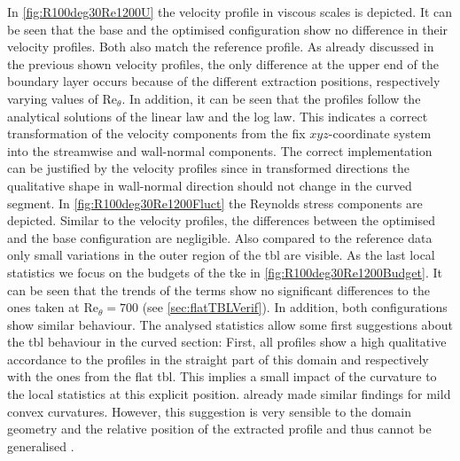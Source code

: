 In \autoref{fig:R100deg30Re1200U} the velocity profile in viscous scales is depicted.
It can be seen that the base and the optimised configuration show no difference in their velocity profiles.
Both also match the reference profile.
As already discussed in the previous shown velocity profiles, the only difference at the upper end of the boundary layer occurs because of the different extraction positions, respectively varying values of $\mathrm{Re}_{\theta}$. 
In addition, it can be seen that the profiles follow the analytical solutions of the linear law and the log law.
This indicates a correct transformation of the velocity components from the fix $xyz$-coordinate system into the streamwise and wall-normal components. 
The correct implementation can be justified by the velocity profiles since in transformed directions the qualitative shape in wall-normal direction should not change in the curved segment.
In \autoref{fig:R100deg30Re1200Fluct} the Reynolds stress components are depicted.
Similar to the velocity profiles, the differences between the optimised and the base configuration are negligible.
Also compared to the reference data only small variations in the outer region of the \acrshort{tbl} are visible.
As the last local statistics we focus on the budgets of the \acrshort{tke} in \autoref{fig:R100deg30Re1200Budget}.
It can be seen that the trends of the terms show no significant differences to the ones taken at $\mathrm{Re}_{\theta} = 700$ (see \autoref{sec:flatTBLVerif}).
In addition, both configurations show similar behaviour.
The analysed statistics allow some first suggestions about the \acrshort{tbl} behaviour in the curved section:
First, all profiles show a high qualitative accordance to the profiles in the straight part of this domain and respectively with the ones from the flat \acrshort{tbl}.
This implies a small impact of the curvature to the local statistics at this explicit position.
\citet{muck_effect_1985} already made similar findings for mild convex curvatures.
However, this suggestion is very sensible to the domain geometry and the relative position of the extracted profile and thus cannot be generalised \citep{patel_longitudinal_1997}.
\newpage

